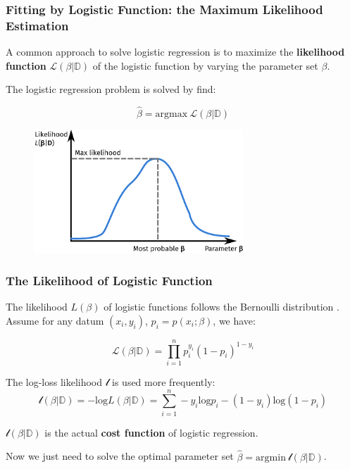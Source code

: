 \documentclass[10pt,aspectratio=169]{beamer}
\begin{document}
  \begin{frame}
    \frametitle{Fitting by Logistic Function: the Maximum Likelihood
      Estimation}

    A common approach to solve logistic regression is to maximize the
    \textbf{likelihood function} $\mathscr{L}(\beta|\mathbb{D})$ of
    the logistic function by varying the parameter set $\beta$.

    The logistic regression problem is solved by find:

    \begin{equation*}
      \hat{\beta} = \mathrm{argmax}\ \mathscr{L}(\beta|\mathbb{D})
    \end{equation*}
    
    \begin{figure}[t] %
      \vspace{-2em}%
      \includegraphics[width=0.7\textwidth]{images/likelihood.pdf}
    \end{figure}

    
  \end{frame}


  \begin{frame}
    \frametitle{The Likelihood of Logistic Function}

    The likelihood $L(\beta)$ of logistic functions follows the
    Bernoulli distribution\let\thefootnote\relax%
    .%
    Assume for any datum
    $(x_{i}, y_{i})$, $p_{i} = p(x_{i}; \beta)$, we have:

        \begin{equation*}
          \mathscr{L}(\beta|\mathbb{D}) = \prod_{i=1}^{n} p_{i}^{y_{i}} (1 - p_{i})^{1-y_{i}}
        \end{equation*}

        The log-loss likelihood $\mathscr{l}$ is used more frequently:
        \begin{equation*}
          \mathscr{l}(\beta|\mathbb{D}) = -\mathrm{log} L(\beta|\mathbb{D}) = \sum_{i=1}^{n} -y_{i} \mathrm{log}p_{i} -  (1 - y_{i}) \mathrm{log}(1 - p_{i})
        \end{equation*}
        
        
        $\mathscr{l}(\beta|\mathbb{D})$ is the actual \textbf{cost
          function} of logistic regression.  \vfill
        
        Now we just need to solve the optimal parameter set
        $\hat{\beta} = \mathrm{argmin}\
        \mathscr{l}(\beta|\mathbb{D})$.
        
      \end{frame}
\end{document}
